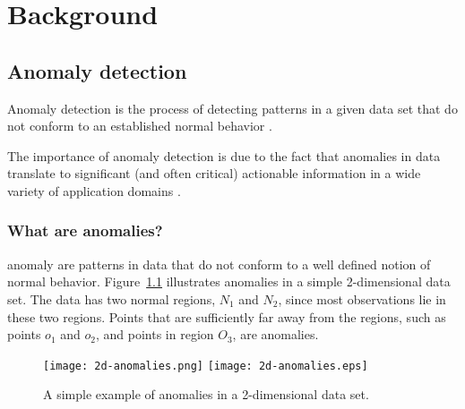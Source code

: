 \chapter{Background}
\label{ch:background}

\section{Anomaly detection}
Anomaly detection is the process of detecting patterns in a given data set that 
do not conform to an established normal behavior \cite{CHANDOLA07}.

The importance of anomaly detection is due to the fact that anomalies in data
translate to significant (and often critical) actionable information in a wide 
variety of application domains \cite{CHANDOLA07}.

\subsection{What are anomalies?}
\Gls{anomaly} are patterns in data that do not conform to a well defined notion 
of normal behavior. Figure~\ref{fig:2d-anomalies} illustrates anomalies in a 
simple 2-dimensional data set. The data has two normal regions, $N_{1}$ and 
$N_{2}$, since most observations lie in these two regions. Points that are 
sufficiently far away from the regions, such as points $o_{1}$ and $o_{2}$, and 
points in region $O_{3}$, are anomalies.

\begin{figure}[H]
\centering
\ifpdf
	\texttt{[image: 2d-anomalies.png]}
\else
	\texttt{[image: 2d-anomalies.eps]}
\fi
\caption{A simple example of anomalies in a 2-dimensional data set.}
\label{fig:2d-anomalies}
\end{figure}

